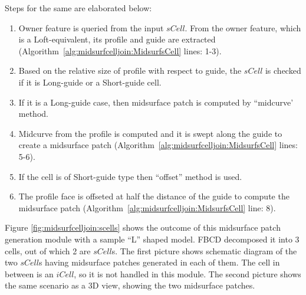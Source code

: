 \bigskip





Steps for the same are elaborated below:

\begin{enumerate}
[noitemsep,topsep=2pt,parsep=2pt,partopsep=2pt]
\item Owner feature is queried from the input $sCell$. From the owner feature, which is a Loft-equivalent, its profile and guide are extracted (Algorithm~\ref{alg:midsurfcelljoin:MidsurfsCell} lines: 1-3).
\item Based on the relative size of profile with respect to guide, the $sCell$ is checked if it is Long-guide or a Short-guide cell.
\item If it is a Long-guide case, then midsurface patch is computed by ``midcurve' method.
\item Midcurve from the profile is computed and it is swept along the guide to create a midsurface patch (Algorithm~\ref{alg:midsurfcelljoin:MidsurfsCell} lines: 5-6).
\item If the cell is of Short-guide type then ``offset'' method is used.
\item The profile face is offseted at half the distance of the guide to compute the midsurface patch (Algorithm~\ref{alg:midsurfcelljoin:MidsurfsCell} line: 8).
\end{enumerate}

	
Figure \ref{fig:midsurfcelljoin:scells} shows the outcome of this midsurface patch generation module with a sample ``L'' shaped model. FBCD decomposed it into 3 cells, out of which 2 are $sCell$s. The first picture shows schematic diagram of the two $sCell$s having midsurface patches generated in each of them. The cell in between is an $iCell$, so it is not handled in this module. The second picture shows the same scenario as a 3D view, showing the two midsurface patches.


